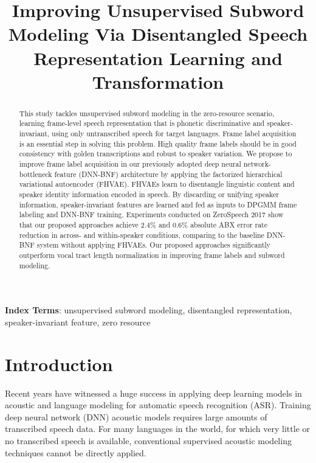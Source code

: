 \documentclass[a4paper]{article}
\title{Improving Unsupervised Subword Modeling Via Disentangled Speech Representation Learning and Transformation}
\begin{document}
\maketitle
% 
\begin{abstract}
This study tackles unsupervised subword modeling in the zero-resource scenario, learning frame-level speech representation that is phonetic discriminative and speaker-invariant, using only untranscribed speech for target languages. Frame label acquisition is an essential step in solving this problem. High quality frame labels  should be in good consistency with golden transcriptions and robust to speaker variation. We propose to improve frame label acquisition in our previously adopted deep neural network-bottleneck feature (DNN-BNF) architecture by applying the factorized hierarchical variational autoencoder (FHVAE). FHVAEs learn to disentangle linguistic content and speaker identity information encoded in speech. By discarding or unifying speaker information, speaker-invariant features are learned and fed as inputs to DPGMM frame labeling and DNN-BNF training. Experiments conducted on ZeroSpeech 2017 show that our proposed approaches achieve $2.4\%$ and $0.6\%$ absolute ABX error rate reduction in across- and within-speaker conditions, comparing to the baseline DNN-BNF system without applying FHVAEs.
Our proposed approaches significantly outperform vocal tract length normalization in improving frame labels and subword modeling.

\end{abstract}
\noindent\textbf{Index Terms}: unsupervised subword modeling, disentangled representation, speaker-invariant feature, zero resource

\section{Introduction}
Recent years have witnessed a huge success in applying deep learning  models in acoustic and language modeling for automatic speech recognition (ASR). 
Training  deep neural network (DNN) acoustic models  requires large amounts of transcribed speech data. 
For many languages in the world, for which very little or no transcribed speech is available, conventional supervised acoustic modeling techniques cannot be  directly applied.
\end{document}
